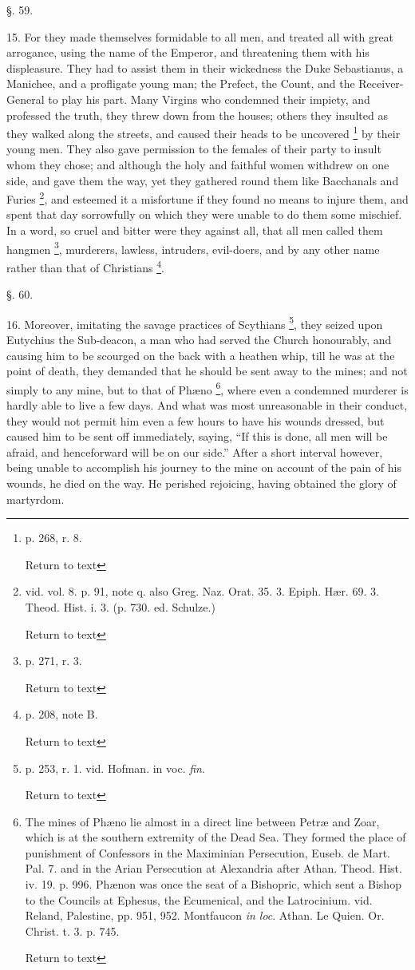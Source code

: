 §. 59.

15. For they made themselves formidable to all
men, and treated all with great arrogance, using the name of the
Emperor, and threatening them with his displeasure. They had to assist them in their wickedness the Duke Sebastianus, a Manichee, and
a profligate young man; the Prefect, the Count, and the
Receiver-General to play his part. Many Virgins who condemned their
impiety, and professed the truth, they threw down from the houses;
others they insulted as they walked along the streets, and caused
their heads to be uncovered \footnote{p. 268, r. 8.

Return to text} by their young men. They also
gave permission to the females of their party to insult whom they
chose; and although the holy and faithful women withdrew on one side,
and gave them the way, yet they gathered round them like Bacchanals
and Furies \footnote{vid. vol. 8. p. 91, note q. also Greg. Naz.
Orat. 35. 3. Epiph. Hær. 69. 3. Theod. Hist. i. 3. (p. 730. ed.
Schulze.)

Return to text}, and esteemed it a misfortune if they found no
means to injure them, and spent that day sorrowfully on which they
were unable to do them some mischief. In a word, so cruel and bitter
were they against all, that all men called them hangmen \footnote{p. 271, r. 3.

Return to text},
murderers, lawless, intruders, evil-doers, and by any other name
rather than that of Christians \footnote{p. 208, note B.

Return to text}.

§. 60.

16. Moreover, imitating the savage practices of
Scythians \footnote{p. 253, r. 1. vid. Hofman. in voc. \emph{fin}.

Return to text}, they seized upon Eutychius the Sub-deacon, a man
who had served the Church honourably, and causing him to be scourged
on the back with a heathen whip, till he was at the point of death,
they demanded that he should be sent away to the mines; and not simply
to any mine, but to that of Phæno \footnote{The mines of Phæno lie almost in a direct
line between Petræ and Zoar, which is at the southern extremity of
the Dead Sea. They formed the place of punishment of Confessors in the
Maximinian Persecution, Euseb. de Mart. Pal. 7. and in the Arian
Persecution at Alexandria after Athan. Theod. Hist. iv. 19. p. 996. Phænon
was once the seat of a Bishopric, which sent a Bishop to the Councils
at Ephesus, the Ecumenical, and the Latrocinium. vid. Reland,
Palestine, pp. 951, 952. Montfaucon \emph{in loc}. Athan. Le Quien.
Or. Christ. t. 3. p. 745.

Return to text}, where even a condemned
murderer is hardly able to live a few days. And what was most
unreasonable in their conduct, they would not permit him even a few
hours to have his wounds dressed, but caused him to be sent off
immediately, saying, ``If this is done, all men will be afraid, and
henceforward will be on our side.'' After a short interval however,
being unable to accomplish his journey to the mine on account of the
pain of his wounds, he died on the way. He perished rejoicing, having
obtained the glory of martyrdom.

